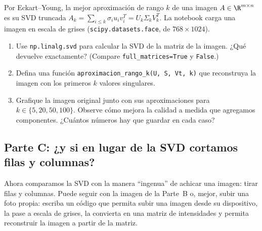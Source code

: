 Por Eckart--Young, la mejor aproximación de rango $k$ de una imagen
$A\in\R^{m\times n}$ es su SVD truncada
$A_k=\sum_{i\le k}\sigma_iu_iv_i^T=U_k\Sigma_kV_k^T$. La notebook
carga una imagen en escala de grises (\texttt{scipy.datasets.face}, de
$768\times1024$).

\begin{enumerate}[leftmargin=*,label=\textbf{TP.\arabic*},ref=TP.\arabic*,itemsep=6pt,resume]

\item Use \texttt{np.linalg.svd} para calcular la SVD de la matriz de la
imagen. ¿Qué devuelve exactamente? (Compare \texttt{full\_matrices=True} y
\texttt{False}.)

\item Defina una función \texttt{aproximacion\_rango\_k(U, S, Vt, k)} que
reconstruya la imagen con los primeros $k$ valores singulares.

\item Grafique la imagen original junto con sus aproximaciones para
$k\in\{5,20,50,100\}$. Observe cómo mejora la calidad a medida que agregamos
componentes. ¿Cuántos números hay que guardar en cada caso?

\end{enumerate}

\subsection*{Parte C: ¿y si en lugar de la SVD cortamos filas y columnas?}

Ahora comparamos la SVD con la manera ``ingenua'' de achicar una imagen:
tirar filas y columnas. Puede seguir con la imagen de la Parte~B o, mejor,
subir una foto propia: escriba un código que permita subir una imagen desde
su dispositivo, la pase a escala de grises, la convierta en una matriz de
intensidades y permita reconstruir la imagen a partir de la matriz.

